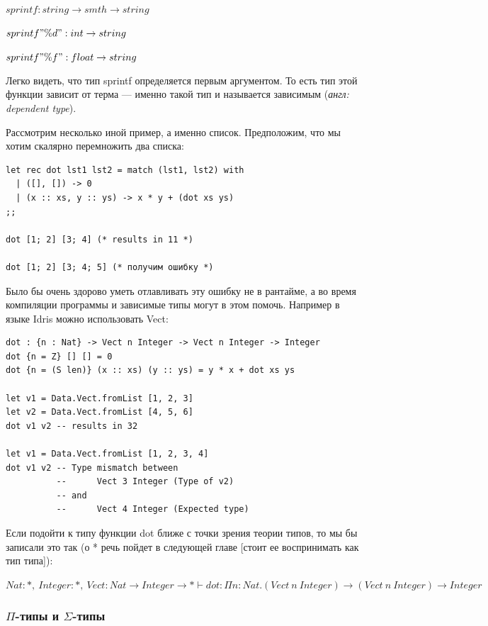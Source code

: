     $sprintf : string \rightarrow smth \rightarrow string$
    
    $sprintf "\%d" : int \rightarrow string$
    
    $sprintf "\%f" : float \rightarrow string$
    
Легко видеть, что тип sprintf определяется первым аргументом. То есть тип этой функции зависит от терма — именно такой тип и называется зависимым (\textit{англ: dependent type}). 

Рассмотрим несколько иной пример, а именно список. Предположим, что мы хотим скалярно перемножить два списка: 

\begin{verbatim}
let rec dot lst1 lst2 = match (lst1, lst2) with
  | ([], []) -> 0
  | (x :: xs, y :: ys) -> x * y + (dot xs ys)
;;

dot [1; 2] [3; 4] (* results in 11 *)

dot [1; 2] [3; 4; 5] (* получим ошибку *)

\end{verbatim}

Было бы очень здорово уметь отлавливать эту ошибку не в рантайме, а во время компиляции программы и зависимые типы могут в этом помочь. Например в языке Idris можно использовать Vect: 

\begin{verbatim}
dot : {n : Nat} -> Vect n Integer -> Vect n Integer -> Integer
dot {n = Z} [] [] = 0
dot {n = (S len)} (x :: xs) (y :: ys) = y * x + dot xs ys 

let v1 = Data.Vect.fromList [1, 2, 3]
let v2 = Data.Vect.fromList [4, 5, 6]
dot v1 v2 -- results in 32

let v1 = Data.Vect.fromList [1, 2, 3, 4]
dot v1 v2 -- Type mismatch between
          --      Vect 3 Integer (Type of v2)
          -- and
          --      Vect 4 Integer (Expected type)
\end{verbatim}

Если подойти к типу функции dot ближе с точки зрения теории типов, то мы бы записали это так (о * речь пойдет в следующей главе [стоит ее воспринимать как тип типа]):

$Nat : *,\ Integer : *,\ Vect : Nat \rightarrow Integer \rightarrow * \vdash dot : \Pi n : Nat. (Vect\ n\ Integer) \rightarrow (Vect\ n\ Integer) \rightarrow Integer$

\subsubsection{$\Pi$-типы и $\Sigma$-типы}

